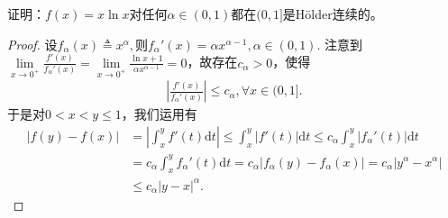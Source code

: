 \documentclass[../../main.tex]{subfiles}%
\begin{document}
\begin{example}
证明：$f(x)=x\ln x$对任何$\alpha\in(0,1)$都在$(0,1]$是Hölder连续的。
\end{example}
\begin{proof}

设$
f_\alpha(x)\triangleq x^\alpha,$则$ f_\alpha'(x)=\alpha x^{\alpha-1},\alpha\in(0,1).$
注意到$\lim\limits_{x\to 0^+}\frac{f'(x)}{f_\alpha'(x)}=\lim\limits_{x\to 0^+}\frac{\ln x + 1}{\alpha x^{\alpha-1}}=0$，故存在$c_\alpha>0$，使得
\begin{align*}
\left|\frac{f'(x)}{f_\alpha'(x)}\right|\leqslant c_\alpha,\forall x\in(0,1].
\end{align*}
于是对$0<x<y\leqslant1$，我们运用有
\begin{align*}
|f(y)-f(x)|&=\left| \int_x^y f'(t)\mathrm{d}t \right|\leqslant \int_x^y |f'(t)|\mathrm{d}t\leqslant c_{\alpha}\int_x^y |f_\alpha'(t)|\mathrm{d}t \\
&=c_{\alpha}\int_x^y f_\alpha'(t)\mathrm{d}t=c_{\alpha}|f_\alpha(y)-f_\alpha(x)|=c_{\alpha}\left| y^{\alpha}-x^{\alpha} \right| \\
&\leqslant c_{\alpha}|y-x|^{\alpha}.
\end{align*}
\end{proof}
\end{document}
